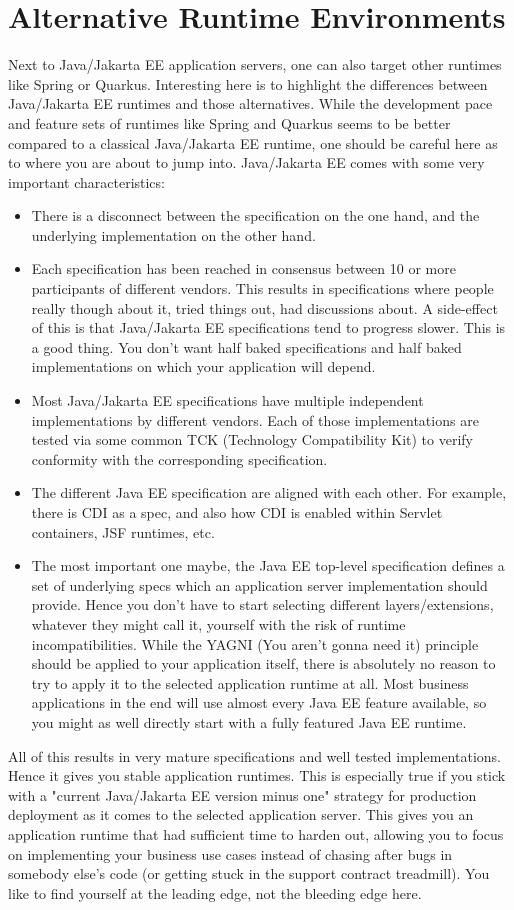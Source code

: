\section{Alternative Runtime Environments}
Next to Java/Jakarta EE application servers,
one can also target other runtimes like Spring or Quarkus.
Interesting here is to highlight the differences between Java/Jakarta EE runtimes and those alternatives.
While the development pace and feature sets of runtimes like Spring and Quarkus seems to be better compared to a classical Java/Jakarta EE runtime, one should be careful here as to where you are about to jump into.
Java/Jakarta EE comes with some very important characteristics:
\begin{itemize}
	\item There is a disconnect between the specification on the one hand, and the underlying implementation on the other hand.
	\item Each specification has been reached in consensus between 10 or more participants of different vendors.
	This results in specifications where people really though about it, tried things out, had discussions about.
	A side-effect of this is that Java/Jakarta EE specifications tend to progress slower.
	This is a good thing.
	You don't want half baked specifications and half baked implementations on which your application will depend.
	\item Most Java/Jakarta EE specifications have multiple independent implementations by different vendors.
	Each of those implementations are tested via some common TCK (Technology Compatibility Kit) to verify conformity with the corresponding specification.
	\item The different Java EE specification are aligned with each other.
	For example, there is CDI as a spec, and also how CDI is enabled within Servlet containers, JSF runtimes, etc.
	\item The most important one maybe, the Java EE top-level specification defines a set of underlying specs which an application server implementation should provide.
	Hence you don't have to start selecting different layers/extensions, whatever they might call it, yourself with the risk of runtime incompatibilities.
	While the YAGNI (You aren't gonna need it) principle should be applied to your application itself, there is absolutely no reason to try to apply it to the selected application runtime at all.
	Most business applications in the end will use almost every Java EE feature available, so you might as well directly start with a fully featured Java EE runtime.
\end{itemize}
All of this results in very mature specifications and well tested implementations.
Hence it gives you stable application runtimes.
This is especially true if you stick with a "current Java/Jakarta EE version minus one" strategy for production deployment as it comes to the selected application server.
This gives you an application runtime that had sufficient time to harden out,
allowing you to focus on implementing your business use cases instead of chasing after bugs in somebody else's code (or getting stuck in the support contract treadmill).
You like to find yourself at the leading edge, not the bleeding edge here.

